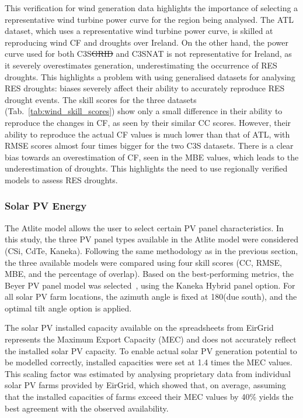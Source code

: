 \documentclass[preprint, 12pt]{elsarticle}
\providecommand{\DIFadd}[1]{{\protect\color{blue}\uwave{#1}}} %
\providecommand{\DIFdel}[1]{{\protect\color{red}\sout{#1}}}                      %
\providecommand{\DIFaddbegin}{} %
\providecommand{\DIFaddend}{} %
\providecommand{\DIFdelbegin}{} %
\providecommand{\DIFdelend}{} %
\begin{document}
This verification for wind generation data highlights the importance of selecting a representative wind turbine power curve for the region being analysed. The ATL dataset, which uses a representative wind turbine power curve, is skilled at reproducing wind CF and \DIFaddbegin \DIFadd{RES }\DIFaddend droughts over Ireland. On the other hand, the power curve used for both C3S\DIFdelbegin \DIFdel{GRID }\DIFdelend \DIFaddbegin \DIFadd{~GRD }\DIFaddend and C3S\DIFaddbegin \DIFadd{~}\DIFaddend NAT is not representative for Ireland, as it severely overestimates generation, underestimating the occurrence of RES droughts. This highlights a problem with using generalised datasets for analysing RES droughts: biases severely affect their ability to accurately reproduce RES drought events. The skill scores for the three datasets (Tab.~\ref{tab:wind_skill_scores}) show only a small difference in their ability to reproduce the changes in CF, as seen by their similar CC scores. However, their ability to reproduce the actual CF values is much lower than that of ATL, with RMSE scores almost four times bigger for the two C3S datasets. There is a clear bias towards an overestimation of CF, seen in the MBE values, which leads to the underestimation of \DIFaddbegin \DIFadd{RES }\DIFaddend droughts. This highlights the need to use regionally verified models to assess RES droughts.

\subsubsection{Solar PV Energy}
\label{sec:pv_verification}

The Atlite model allows the user to select certain PV panel characteristics. In this study, the three PV panel types available in the Atlite model were considered (CSi, CdTe, Kaneka). Following the same methodology as in the previous section, the three available models were compared using four skill scores (CC, RMSE, MBE, and the percentage of overlap). Based on the best-performing metrics, the Beyer PV panel model was selected~\citep{beyer2004pv}, using the Kaneka Hybrid panel option. For all solar PV farm locations, the azimuth angle is fixed at 180\textdegree (due south), and the optimal tilt angle option is applied. 

The solar PV installed capacity available on the spreadsheets from EirGrid represents the Maximum Export Capacity (MEC) and does not accurately reflect the installed solar PV capacity. To enable actual solar PV generation potential to be modelled correctly, installed capacities were set at 1.4 times the MEC values. This scaling factor was estimated by analysing proprietary data from individual solar PV farms provided by EirGrid, which showed that, on average, assuming that the installed capacities of farms exceed their MEC values by 40\% yields the best agreement with the observed availability.
\end{document}
